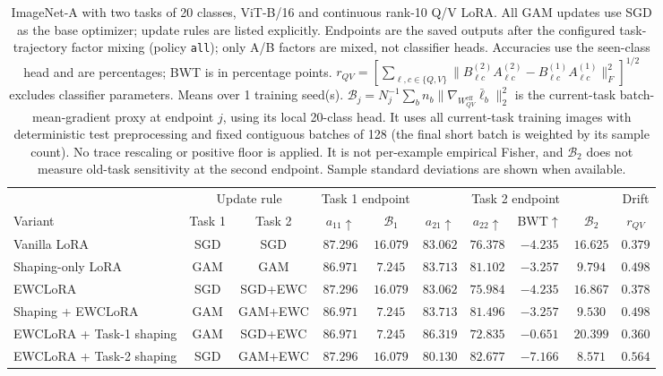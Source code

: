 \begin{table}[t]
\centering\scriptsize
\caption{ImageNet-A with two tasks of 20 classes, ViT-B/16 and continuous rank-10 Q/V LoRA. All GAM updates use SGD as the base optimizer; update rules are listed explicitly. Endpoints are the saved outputs after the configured task-trajectory factor mixing (policy \texttt{all}); only A/B factors are mixed, not classifier heads. Accuracies use the seen-class head and are percentages; BWT is in percentage points. $r_{QV}=\left[\sum_{\ell,c\in\{Q,V\}}\|B^{(2)}_{\ell c}A^{(2)}_{\ell c}-B^{(1)}_{\ell c}A^{(1)}_{\ell c}\|_F^2\right]^{1/2}$ excludes classifier parameters. Means over 1 training seed(s). $\mathcal B_j=N_j^{-1}\sum_b n_b\|\nabla_{W^{\mathrm{eff}}_{QV}}\bar\ell_b\|_2^2$ is the current-task batch-mean-gradient proxy at endpoint $j$, using its local 20-class head. It uses all current-task training images with deterministic test preprocessing and fixed contiguous batches of 128 (the final short batch is weighted by its sample count). No trace rescaling or positive floor is applied. It is not per-example empirical Fisher, and $\mathcal B_2$ does not measure old-task sensitivity at the second endpoint. Sample standard deviations are shown when available.}
\setlength{\tabcolsep}{2.5pt}
\begin{tabular*}{\textwidth}{@{\extracolsep{\fill}}lccccccccc@{}}
\toprule
& \multicolumn{2}{c}{Update rule} & \multicolumn{2}{c}{Task 1 endpoint} & \multicolumn{4}{c}{Task 2 endpoint} & Drift \\
\cmidrule(lr){2-3}\cmidrule(lr){4-5}\cmidrule(lr){6-9}
Variant & Task 1 & Task 2 & $a_{11}\uparrow$ & $\mathcal B_1$ & $a_{21}\uparrow$ & $a_{22}\uparrow$ & BWT$\uparrow$ & $\mathcal B_2$ & $r_{QV}$ \\
\midrule
Vanilla LoRA & SGD & SGD & $87.296$ & $16.079$ & $83.062$ & $76.378$ & $-4.235$ & $16.625$ & $0.379$ \\
Shaping-only LoRA & GAM & GAM & $86.971$ & $7.245$ & $83.713$ & $81.102$ & $-3.257$ & $9.794$ & $0.498$ \\
EWCLoRA & SGD & SGD+EWC & $87.296$ & $16.079$ & $83.062$ & $75.984$ & $-4.235$ & $16.867$ & $0.378$ \\
Shaping + EWCLoRA & GAM & GAM+EWC & $86.971$ & $7.245$ & $83.713$ & $81.496$ & $-3.257$ & $9.530$ & $0.498$ \\
\midrule
EWCLoRA + Task-1 shaping & GAM & SGD+EWC & $86.971$ & $7.245$ & $86.319$ & $72.835$ & $-0.651$ & $20.399$ & $0.360$ \\
EWCLoRA + Task-2 shaping & SGD & GAM+EWC & $87.296$ & $16.079$ & $80.130$ & $82.677$ & $-7.166$ & $8.571$ & $0.564$ \\
\bottomrule
\end{tabular*}
\end{table}
